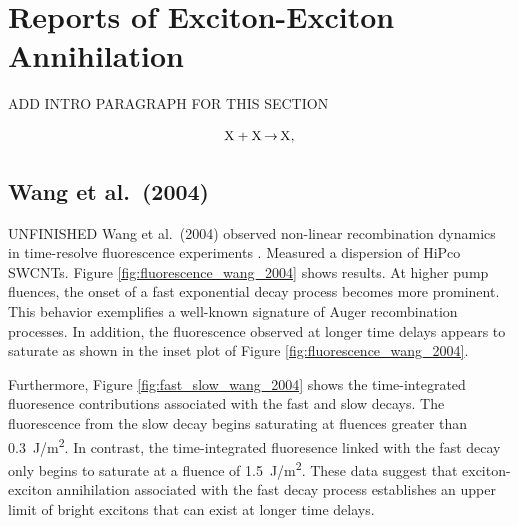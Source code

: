 \section{Reports of Exciton-Exciton Annihilation}

{\color{red} ADD INTRO PARAGRAPH FOR THIS SECTION}

\begin{equation}
\label{eq:exc_annih}
\ce{X + X $\rightarrow$ X},
\end{equation}

\subsection{Wang et al.\ (2004)}
{\color{red} UNFINISHED}
Wang et al.\ (2004) observed non-linear recombination dynamics in time-resolve fluorescence experiments \cite{wang2004observation}. Measured a dispersion of HiPco SWCNTs. Figure \ref{fig:fluorescence_wang_2004} shows results. At higher pump fluences, the onset of a fast exponential decay process becomes more prominent. This behavior exemplifies a well-known signature of Auger recombination processes. In addition, the fluorescence observed at longer time delays appears to saturate as shown in the inset plot of Figure \ref{fig:fluorescence_wang_2004}.



Furthermore, Figure \ref{fig:fast_slow_wang_2004} shows the time-integrated fluoresence contributions associated with the fast and slow decays. The fluorescence from the slow decay begins saturating at fluences greater than \SI{0.3}{\joule / \meter\squared}. In contrast, the time-integrated fluoresence linked with the fast decay only begins to saturate at a fluence of \SI{1.5}{\joule / \meter\squared}. These data suggest that exciton-exciton annihilation associated with the fast decay process establishes an upper limit of bright excitons that can exist at longer time delays.





